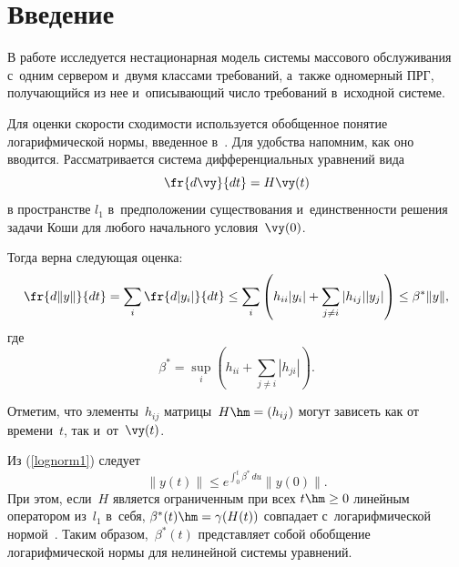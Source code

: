

 \thispagestyle{headings}
 
 \vspace*{-12pt}

\section{Введение}

В работе  исследуется нестационарная модель системы массового обслуживания с~одним сервером 
и~двумя классами требований, а~также одномерный ПРГ, по\-лу\-ча\-ющий\-ся из нее 
и~опи\-сы\-ва\-ющий чис\-ло требований в~исходной сис\-теме.

Для оценки скорости сходимости используется обобщенное понятие логарифмической нормы, 
введенное в~\cite{multid}. Для удобства напомним, как оно вводится. 
Рассматривается система   дифференциальных уравнений вида
\begin{equation} 
\label{ur0100}
\fr{d\vy}{dt}=H\vy(t)
\end{equation}
в пространстве $l_1$  в~предположении  существования и~единственности 
решения задачи Коши для любого начального условия~$\vy(0)$.

Тогда верна следующая оценка:
\begin{equation}
\fr{d \|y\|}{dt} = \sum\limits_i \fr{d |y_i|}{dt} \le \sum\limits_i\left(
h_{ii}|y_i|+\sum\limits_{j\neq i} |h_{ij}||y_j| \right) \le \beta^* \|y\|,
\label{lognorm1}
\end{equation}
 где
\begin{equation*}
\beta^*= \sup\limits_i\left(h_{ii}+\sum\limits_{j\neq i} |h_{ji}|\right).
\end{equation*}

Отметим, что элементы~$h_{ij}$ матрицы~$H\hm=(h_{ij})$ могут зависеть как от времени~$t$, так и~от~$\vy(t)$.


 Из (\ref{lognorm1}) следует
\begin{equation*}
\|y(t)\| \le e^{\int\nolimits_0^t \beta^* \, du} \|y(0)\|. 
\end{equation*}
При этом, если~$H$ является ограниченным при всех $t\hm\ge 0$ линейным оператором из~$l_1$ в~себя, 
$\beta^*(t)\hm=\gamma(H(t))$ совпадает с~логарифмической нормой~\cite{gz04, Zeifman1995}.
Таким образом,~$\beta^*(t)$ представляет собой обобщение логарифмической нормы 
для нелинейной системы уравнений.

